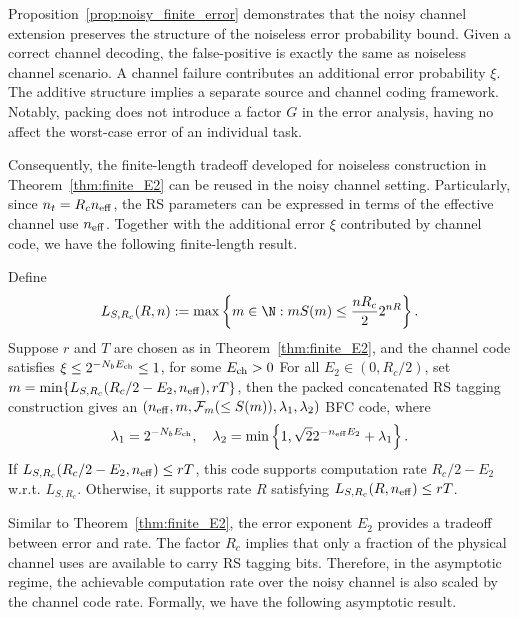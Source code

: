 Proposition~\ref{prop:noisy_finite_error} demonstrates that the noisy channel extension preserves the structure of the noiseless error probability bound. Given a correct channel decoding, the false-positive is exactly the same as noiseless channel scenario. A channel failure contributes an additional error probability $\xi$. The additive structure implies a separate source and channel coding framework. Notably, packing does not introduce a factor $G$ in the error analysis, having no affect the worst-case error of an individual task.

Consequently, the finite-length tradeoff developed for noiseless construction in Theorem~\ref{thm:finite_E2} can be reused in the noisy channel setting.
Particularly, since $n_t=R_cn_{\rm eff}$, the RS parameters can be expressed in terms of the effective channel use $n_{\rm eff}$. Together with the additional error $\xi$ contributed by channel code, we have the following finite-length result.
\begin{corollary}
    \label{cor:noisy_finite_E2}
    Define
    \begin{equation}
        \label{equ:noisy_scaling_function}
        L_{S,R_c}(R,n) := \max\left\{m\in\N:mS(m)\leq\frac{nR_c}{2}2^{nR}\right\}.
    \end{equation}
    Suppose $r$ and $T$ are chosen as in Theorem~\ref{thm:finite_E2}, and the channel code satisfies $\xi\leq 2^{-N_b E_{\rm ch}}\leq 1$, for some $E_{\rm ch}>0$
    For all $E_2\in (0,R_c/2)$, set $m=\min\{L_{S,R_c}(R_c/2-E_2,n_{\rm eff}),rT\}$, then the packed concatenated RS tagging construction gives an $(n_{\rm eff},m,\mathcal{F}_m(\leq S(m)),\lambda_1,\lambda_2)$ BFC code, where
    \begin{equation}
        \lambda_1 =2^{-N_b E_{\rm ch}},\quad \lambda_2 = \min\left\{1,\sqrt{2}2^{-n_{\rm eff}E_2} +\lambda_1\right\}.
    \end{equation}
    If $L_{S,R_c}(R_c/2-E_2,n_{\rm eff})\leq rT$, this code supports computation rate $R_c/2-E_2$ w.r.t. $L_{S,R_c}$. Otherwise, it supports rate $R$ satisfying $L_{S,R_c}(R,n_{\rm eff})\leq rT$.
\end{corollary}

Similar to Theorem~\ref{thm:finite_E2}, the error exponent $E_2$ provides a tradeoff between error and rate. The factor $R_c$ implies that only a fraction of the physical channel uses are available to carry RS tagging bits. Therefore, in the asymptotic regime, the achievable computation rate over the noisy channel is also scaled by the channel code rate. Formally, we have the following asymptotic result.

